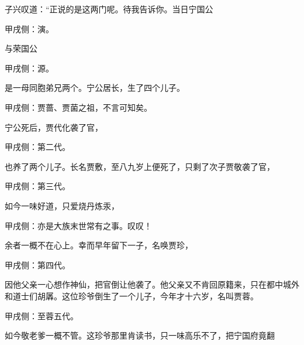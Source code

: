 \begin{parag}
    子兴叹道：“正说的是这两门呢。待我告诉你。当日宁国公\begin{note}甲戌侧：演。\end{note}与荣国公\begin{note}甲戌侧：源。\end{note}是一母同胞弟兄两个。宁公居长，生了四个儿子。\begin{note}甲戌侧：贾蔷、贾菌之祖，不言可知矣。\end{note}宁公死后，贾代化袭了官，\begin{note}甲戌侧：第二代。\end{note}也养了两个儿子。长名贾敷，至八九岁上便死了，只剩了次子贾敬袭了官，\begin{note}甲戌侧：第三代。\end{note}如今一味好道，只爱烧丹炼汞，\begin{note}甲戌侧：亦是大族末世常有之事。叹叹！\end{note}余者一概不在心上。幸而早年留下一子，名唤贾珍，\begin{note}甲戌侧：第四代。\end{note}因他父亲一心想作神仙，把官倒让他袭了。他父亲又不肯回原籍来，只在都中城外和道士们胡羼。这位珍爷倒生了一个儿子，今年才十六岁，名叫贾蓉。\begin{note}甲戌侧：至蓉五代。\end{note}如今敬老爹一概不管。这珍爷那里肯读书，只一味高乐不了，把宁国府竟翻
\end{parag}
